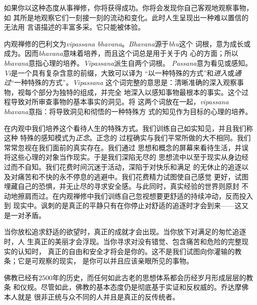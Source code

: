 如果你以这种态度从事禅修，你将获得成功。你将会发现你自己客观地观察事物，如
其所是地观察它们一刻接一刻的流动和变化。此时人生呈现出一种难以置信的无法用
言语描述的丰富多采。它只能被体验。

内观禅修的巴利文为{\it vipassana bhavana}。{\it Bhavana}源于{\it bhu}这个
词根，意为成长或成为。因而{\it bhavana}意味着培养，而且这个词总是用于关于内
心的方面；所以{\it bhavana}意指心理的培养。{\it Vipassana}派生自两个词根。
{\it Passana}意为看见或感知。{\it Vi}是一个具有复杂含意的前缀，大致可以\1译为
“以一种特殊的方式”和{\it 进入}或{\it 通过}“一种特殊的方式”。{\it Vipassana}%
这个词完整的意思是：清晰准确的深入观察事物，视每个部分为独特的组成，并完全
地深入以感知事物最根本的事实。这个过程导致对所审查事物的基本事实的洞见。将
这两个词放在一起，{\it vipassana bhavana}意指：将导致洞见和彻悟的一种特殊方
式的知见作为目标的心理的培养。

在内观中我们培养这个看待人生的特殊方式。我们训练自己如实知见，并且我们称这种
特殊的感知模式为{\it 正念}。正念的
过程确实与我们平常所做的大不相同。我们常常忽视在我们面前的真实存在。我们通过
思想和概念的屏幕来看待生活，并误将这些心理的对象当作现实。于是我们深陷无尽的
思想流中以至于现实从身边经过而不自知。我们花费时间沉迷于活动，深陷于对快乐和满足
的无休止的追逐以及对痛苦和不快的永不停息的逃避中。我们花费精力试图使自己感觉
更好，试图埋藏自己的恐惧，并无止尽的寻求安全感。与此同时，真实经验的世界则原封
不动地擦肩而过。在内观禅修中我们训练自己忽视想要更舒适的持续冲动，反而投入到
现实中。讽刺的是真正的平静只有在你停止对舒适的追逐时才会到来——这又是一对矛盾。

当你放松追求舒适的欲望时，真正的成就才会出现。当你放下对满足的匆忙追逐时，人
生真正的美丽才会浮现。当你寻求对没有错觉、包含痛苦和危险的完整现实的认知时，
真正的自由和安全才将会是你的。这不是我们试图向你灌输的教条；它是可观察的现实，
是你可以并且应该亲眼所见的事物。

\1佛教已经有2500年的历史，而任何如此古老的思想体系都会历经岁月形成层层的教条
和仪规。尽管如此，佛教的基本态度仍是彻底基于实证和反权威的。乔达摩佛本人就是
很非正统与众不同的人并且是真正的反传统者。

\endchapter

\byebye
